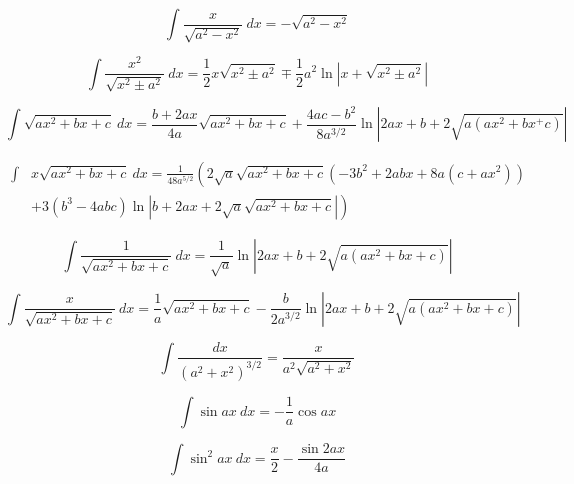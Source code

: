 \begin{equation*}
\int \frac{x}{\sqrt{a^2-x^2}}\ dx = -\sqrt{a^2-x^2} 
\end{equation*}

\begin{equation*}\label{eq:Russ}
\int \frac{x^2}{\sqrt{x^2 \pm a^2}}\ dx = \frac{1}{2}x\sqrt{x^2 \pm a^2}
\mp \frac{1}{2}a^2 \ln \left| x + \sqrt{x^2\pm a^2} \right | 
\end{equation*}

\begin{equation*}\label{eq:Winokur1}
\int \sqrt{a x^2 + b x + c}\ dx = 
\frac{b+2ax}{4a}\sqrt{ax^2+bx+c}
+
\frac{4ac-b^2}{8a^{3/2}}\ln \left| 2ax + b + 2\sqrt{a(ax^2+bx^+c)}\right |
\end{equation*}

\begin{equation*}\label{eq:Larry-Morris}\begin{split}
\int &x \sqrt{a x^2 + bx + c}\ dx = \frac{1}{48a^{5/2}}\left ( 
2 \sqrt{a} \sqrt{ax^2+bx+c}
\right .  
 \left( - 3b^2 + 2 abx + 8 a(c+ax^2) \right)
\\ &  \left.
+ 3(b^3-4abc)\ln \left|b + 2ax + 2\sqrt{a}\sqrt{ax^2+bx+c} \right| \right)
\end{split}
\end{equation*}

\begin{equation*}
\int\frac{1}{\sqrt{ax^2+bx+c}}\ dx=
\frac{1}{\sqrt{a}}\ln \left| 2ax+b + 2 \sqrt{a(ax^2+bx+c)} \right | 
\end{equation*}

\begin{equation*}\label{eq:Duley}
\int \frac{x}{\sqrt{ax^2+bx+c}}\ dx=
\frac{1}{a}\sqrt{ax^2+bx + c} 
-
\frac{b}{2a^{3/2}}\ln \left| 2ax+b + 2 \sqrt{a(ax^2+bx+c)} \right |
\end{equation*}

\begin{equation*}\label{eq:Winokur2}
\int\frac{dx}{(a^2+x^2)^{3/2}}=\frac{x}{a^2\sqrt{a^2+x^2}}
\end{equation*}

\begin{equation*}
\int \sin ax \ dx = -\frac{1}{a} \cos ax 
\end{equation*}

\begin{equation*}
\int \sin^2 ax\  dx = \frac{x}{2} - \frac{\sin 2ax} {4a} 
\end{equation*}

